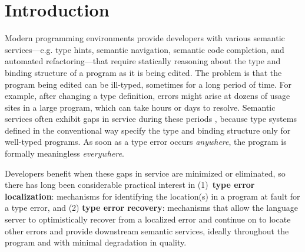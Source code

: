 \section{Introduction}
\label{sec:introduction}


Modern programming environments provide developers with 
various semantic services---e.g. type hints, semantic navigation, semantic code completion, and automated refactoring---that require statically reasoning about the type and binding structure of a program as it is being edited. 
The problem is that the program being edited can be ill-typed, sometimes for a long period of time. 
For example, after changing a type definition, errors might arise at dozens of usage sites in a large program, which can take hours or days to resolve. Semantic services often exhibit gaps in service during these periods \cite{HazelnutSNAPL}, because type systems defined in the conventional way specify the type and binding structure only for well-typed programs. As soon as a type error occurs \emph{anywhere}, the program is formally meaningless \emph{everywhere}.

Developers benefit when these gaps in service are minimized or eliminated, so there has long been considerable practical interest in (1)~\textbf{type error localization}: mechanisms for identifying the location(s) in a program at fault for a type error, and (2) \textbf{type error recovery}: 
mechanisms that allow the language server to optimistically recover from a localized error and continue on to locate other errors and provide downstream semantic services, ideally throughout the program and with minimal degradation in quality.

